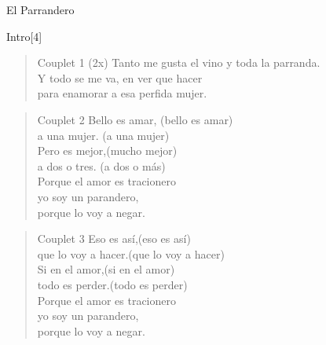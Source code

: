 \begin{song}{El Parrandero}

\begin{instrumental}{Intro}[4]
   \measure{}
   
 \measure{}  \measure{}
   
\end{instrumental}

\begin{verse}{Couplet 1 \textnormal{(2x)}}
Tanto me gusta el vino y toda la parranda.\\
Y todo se me va, en ver que hacer\\
para enamorar a esa perfida mujer. \hspace{1em} 
\end{verse}

\begin{verse}{Couplet 2}
Bello es amar, \hspace{6em}(bello es amar)\\
a una mujer.\hspace{6.9em} (a una mujer)\\
Pero \chord{}es mejor,\hspace{6.3em}(mucho mejor)\\
a dos o tres. \hspace{6.9em}(a dos o más)\\
Porque el amor es tracionero\\
yo soy un parandero,\\
porque lo voy a negar.  \hspace{1em} 
\end{verse}

\begin{verse}{Couplet 3}
Eso es así,\hspace{7.7em}(eso es así)\\
que lo voy a hacer.\hspace{4.3em}(que lo voy a hacer)\\
Si en \chord{}el amor,\hspace{6.6em}(si en el amor)\\
todo es perder.\hspace{6em}(todo es perder)\\
Porque el amor es tracionero\\
yo soy un parandero,\\
porque lo voy a negar.  \hspace{1em} 
\end{verse}

\end{song}

